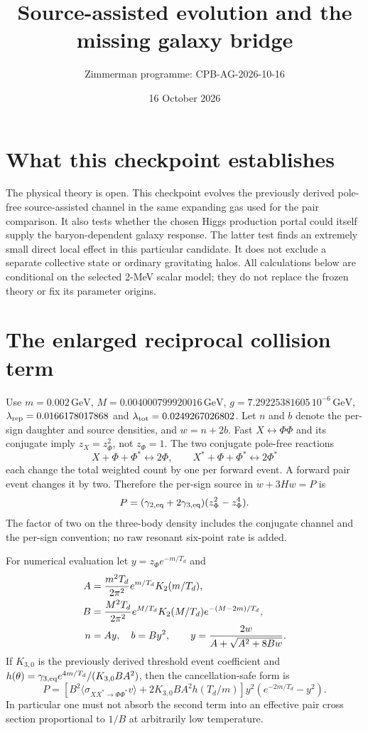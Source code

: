 \documentclass[11pt]{article}
\title{Source-assisted evolution and the missing galaxy bridge}
\author{Zimmerman programme: CPB-AG-2026-10-16}
\date{16 October 2026}
\begin{document}
\maketitle
\section{What this checkpoint establishes}
The physical theory is open. This checkpoint evolves the previously derived
pole-free source-assisted channel in the same expanding gas used for the pair
comparison. It also tests whether the chosen Higgs production portal could
itself supply the baryon-dependent galaxy response. The latter test finds
an extremely small direct local effect in this particular candidate. It
does not exclude a separate collective state or ordinary gravitating halos.
All calculations below are conditional on the selected 2-MeV scalar model;
they do not replace the frozen theory or fix its parameter origins.

\section{The enlarged reciprocal collision term}
Use $m=0.002\,\mathrm{GeV}$, $M=0.004000799920016\,\mathrm{GeV}$,
$g=7.29225381605\,10^{-6}\,\mathrm{GeV}$,
$\lambda_{\rm rep}=0.0166178017868$ and
$\lambda_{\rm tot}=0.0249267026802$. Let $n$ and $b$ denote the
per-sign daughter and source densities, and $w=n+2b$. Fast
$X\leftrightarrow\Phi\Phi$ and its conjugate imply
$z_X=z_\Phi^2$, not $z_\Phi=1$. The two conjugate pole-free reactions
\begin{equation}
 X+\Phi+\Phi^*\leftrightarrow 2\Phi,
 \qquad X^*+\Phi+\Phi^*\leftrightarrow 2\Phi^*
\end{equation}
each change the total weighted count by one per forward event. A forward
pair event changes it by two. Therefore the per-sign source in
$\dot w+3Hw=P$ is
\begin{equation}
 P=(\gamma_{2,\rm eq}+2\gamma_{3,\rm eq})(z_\Phi^2-z_\Phi^4).
 \label{ag:collision}
\end{equation}
The factor of two on the three-body density includes the conjugate channel
and the per-sign convention; no raw resonant six-point rate is added.

For numerical evaluation let $y=z_\Phi e^{-m/T_d}$ and
\begin{align}
 A&={m^2T_d\over2\pi^2}e^{m/T_d}K_2(m/T_d),\\
 B&={M^2T_d\over2\pi^2}e^{M/T_d}K_2(M/T_d)
       e^{-(M-2m)/T_d},\\
 n&=Ay,\quad b=By^2,\qquad
 y={2w\over A+\sqrt{A^2+8Bw}}.
\end{align}
If $K_{3,0}$ is the previously derived threshold event coefficient and
$h(\theta)=\gamma_{3,\rm eq}e^{4m/T_d}/(K_{3,0}BA^2)$,
then the cancellation-safe form is
\begin{equation}
 P=\left[B^2\langle\sigma_{XX^*\to\Phi\Phi^*}v\rangle
             +2K_{3,0}BA^2h(T_d/m)\right]
             y^2(e^{-2m/T_d}-y^2).
 \label{ag:scaled}
\end{equation}
In particular one must not absorb the second term into an effective
pair cross section proportional to $1/B$ at arbitrarily low temperature.
\end{document}
